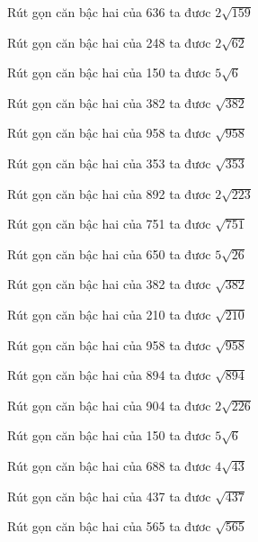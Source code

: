 \documentclass[12pt,a4paper]{article}
\begin{document}
\begin{ex}
Rút gọn căn bậc hai của 636 ta đươc $2\sqrt{159}$
\end{ex}
\begin{ex}
Rút gọn căn bậc hai của 248 ta đươc $2\sqrt{62}$
\end{ex}
\begin{ex}
Rút gọn căn bậc hai của 150 ta đươc $5\sqrt{6}$
\end{ex}
\begin{ex}
Rút gọn căn bậc hai của 382 ta đươc $\sqrt{382}$
\end{ex}
\begin{ex}
Rút gọn căn bậc hai của 958 ta đươc $\sqrt{958}$
\end{ex}
\begin{ex}
Rút gọn căn bậc hai của 353 ta đươc $\sqrt{353}$
\end{ex}
\begin{ex}
Rút gọn căn bậc hai của 892 ta đươc $2\sqrt{223}$
\end{ex}
\begin{ex}
Rút gọn căn bậc hai của 751 ta đươc $\sqrt{751}$
\end{ex}
\begin{ex}
Rút gọn căn bậc hai của 650 ta đươc $5\sqrt{26}$
\end{ex}
\begin{ex}
Rút gọn căn bậc hai của 382 ta đươc $\sqrt{382}$
\end{ex}
\begin{ex}
Rút gọn căn bậc hai của 210 ta đươc $\sqrt{210}$
\end{ex}
\begin{ex}
Rút gọn căn bậc hai của 958 ta đươc $\sqrt{958}$
\end{ex}
\begin{ex}
Rút gọn căn bậc hai của 894 ta đươc $\sqrt{894}$
\end{ex}
\begin{ex}
Rút gọn căn bậc hai của 904 ta đươc $2\sqrt{226}$
\end{ex}
\begin{ex}
Rút gọn căn bậc hai của 150 ta đươc $5\sqrt{6}$
\end{ex}
\begin{ex}
Rút gọn căn bậc hai của 688 ta đươc $4\sqrt{43}$
\end{ex}
\begin{ex}
Rút gọn căn bậc hai của 437 ta đươc $\sqrt{437}$
\end{ex}
\begin{ex}
Rút gọn căn bậc hai của 565 ta đươc $\sqrt{565}$
\end{ex}
\end{document}
